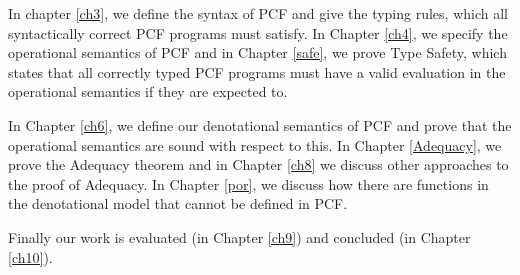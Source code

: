 In chapter \ref{ch3}, we define the syntax of PCF and give the typing rules, which all syntactically correct PCF programs must satisfy. In Chapter \ref{ch4}, we specify the operational semantics of PCF and in Chapter \ref{safe}, we prove Type Safety, which states that all correctly typed PCF programs must have a valid evaluation in the operational semantics if they are expected to.

In Chapter \ref{ch6}, we define our denotational semantics of PCF and prove that the operational semantics are sound with respect to this. In Chapter \ref{Adequacy}, we prove the Adequacy theorem and in Chapter \ref{ch8} we discuss other approaches to the proof of Adequacy. In Chapter \ref{por}, we discuss how there are functions in the denotational model that cannot be defined in PCF.

Finally our work is evaluated (in Chapter \ref{ch9}) and concluded (in Chapter \ref{ch10}).
